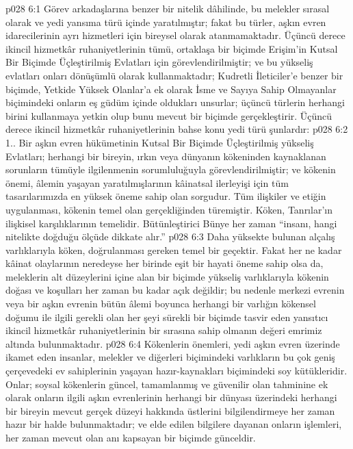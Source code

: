 \vs p028 6:1 Görev arkadaşlarına benzer bir nitelik dâhilinde, bu melekler sırasal olarak ve yedi yansıma türü içinde yaratılmıştır; fakat bu türler, aşkın evren idarecilerinin ayrı hizmetleri için bireysel olarak atanmamaktadır. Üçüncü derece ikincil hizmetkâr ruhaniyetlerinin tümü, ortaklaşa bir biçimde Erişim’in Kutsal Bir Biçimde Üçleştirilmiş Evlatları için görevlendirilmiştir; ve bu yükseliş evlatları onları dönüşümlü olarak kullanmaktadır; Kudretli İleticiler’e benzer bir biçimde, Yetkide Yüksek Olanlar’a ek olarak İsme ve Sayıya Sahip Olmayanlar biçimindeki onların eş güdüm içinde oldukları unsurlar; üçüncü türlerin herhangi birini kullanmaya yetkin olup bunu mevcut bir biçimde gerçekleştirir. Üçüncü derece ikincil hizmetkâr ruhaniyetlerinin bahse konu yedi türü şunlardır:
\vs p028 6:2 1.\bibnobreakspace {}. Bir aşkın evren hükümetinin Kutsal Bir Biçimde Üçleştirilmiş yükseliş Evlatları; herhangi bir bireyin, ırkın veya dünyanın kökeninden kaynaklanan sorunların tümüyle ilgilenmenin sorumluluğuyla görevlendirilmiştir; ve kökenin önemi, âlemin yaşayan yaratılmışlarının kâinatsal ilerleyişi için tüm tasarılarımızda en yüksek öneme sahip olan sorgudur. Tüm ilişkiler ve etiğin uygulanması, kökenin temel olan gerçekliğinden türemiştir. Köken, Tanrılar’ın ilişkisel karşılıklarının temelidir. Bütünleştirici Bünye her zaman “insanı, hangi nitelikte doğduğu ölçüde dikkate alır.”
\vs p028 6:3 Daha yüksekte bulunan alçalış varlıklarıyla köken, doğrulanması gereken temel bir geçektir. Fakat her ne kadar kâinat olaylarının neredeyse her birinde eşit bir hayati öneme sahip olsa da, meleklerin alt düzeylerini içine alan bir biçimde yükseliş varlıklarıyla kökenin doğası ve koşulları her zaman bu kadar açık değildir; bu nedenle merkezi evrenin veya bir aşkın evrenin bütün âlemi boyunca herhangi bir varlığın kökensel doğumu ile ilgili gerekli olan her şeyi sürekli bir biçimde tasvir eden yansıtıcı ikincil hizmetkâr ruhaniyetlerinin bir sırasına sahip olmanın değeri emrimiz altında bulunmaktadır.
\vs p028 6:4 Kökenlerin önemleri, yedi aşkın evren üzerinde ikamet eden insanlar, melekler ve diğerleri biçimindeki varlıkların bu çok geniş çerçevedeki ev sahiplerinin yaşayan hazır\hyp{}kaynakları biçimindeki soy kütükleridir. Onlar; soysal kökenlerin güncel, tamamlanmış ve güvenilir olan tahminine ek olarak onların ilgili aşkın evrenlerinin herhangi bir dünyası üzerindeki herhangi bir bireyin mevcut gerçek düzeyi hakkında üstlerini bilgilendirmeye her zaman hazır bir halde bulunmaktadır; ve elde edilen bilgilere dayanan onların işlemleri, her zaman mevcut olan anı kapsayan bir biçimde günceldir.
